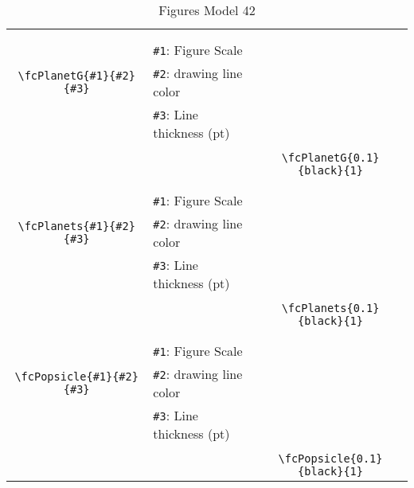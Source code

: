 \documentclass[x11names]{article}
\begin{document}
\begin{table}[H]
\begin{tabular}{|c|l|c|}
	&&\multirow{5}{*}{\fcPlanetG{0.1}{black}{1}}\\	&&\\	&\verb|#1|: Figure Scale &\\	\verb|\fcPlanetG{#1}{#2}{#3}|&	\verb|#2|: drawing line color &\\	&\verb|#3|: Line thickness (pt) &\\ &&\\&&	\verb|\fcPlanetG{0.1}{black}{1}|\\\hline 	
	&&\multirow{5}{*}{\fcPlanets{0.1}{black}{1}}\\	&&\\	&\verb|#1|: Figure Scale &\\	\verb|\fcPlanets{#1}{#2}{#3}|&	\verb|#2|: drawing line color &\\	&\verb|#3|: Line thickness (pt) &\\ &&\\&&	\verb|\fcPlanets{0.1}{black}{1}|\\\hline 	
	&&\multirow{5}{*}{\fcPopsicle{0.1}{black}{1}}\\	&&\\	&\verb|#1|: Figure Scale &\\	\verb|\fcPopsicle{#1}{#2}{#3}|&	\verb|#2|: drawing line color &\\	&\verb|#3|: Line thickness (pt) &\\ &&\\&&	\verb|\fcPopsicle{0.1}{black}{1}|\\\hline 	\hline\end{tabular}\caption{Figures Model 42}\label{tab42}\end{table}
\end{document}
